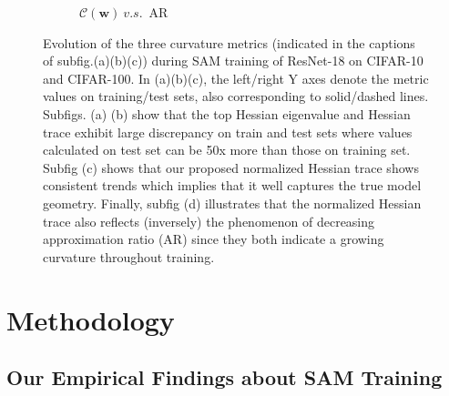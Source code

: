 \documentclass[letterpaper]{article} %
\theoremstyle{plain}
\theoremstyle{definition}
\begin{document}
\begin{figure}[ht!]
\begin{subfigure}{0.45\textwidth}
     \caption{$\mathcal{C}(\boldsymbol{w})  \: v.s. \: \operatorname{AR}$}
     \label{subfig:n_trace_vs_ar}
   \end{subfigure}
    \caption{Evolution of the three curvature metrics (indicated in the captions of subfig.(a)(b)(c)) during SAM training of ResNet-18 on CIFAR-10 and CIFAR-100. In (a)(b)(c), the left/right Y axes denote the metric values on training/test sets, also corresponding to solid/dashed lines. Subfigs. (a) (b) show that the top Hessian eigenvalue and Hessian trace exhibit large discrepancy on train and test sets where values calculated on test set can be 50x more than those on training set. Subfig (c) shows that our proposed normalized Hessian trace shows consistent trends which implies that it well captures the true model geometry. Finally, subfig (d) illustrates that the normalized Hessian trace also reflects (inversely) the phenomenon of decreasing approximation ratio (AR) since they both indicate a growing curvature throughout training.}
    \label{fig:CR}
\end{figure}


\section{Methodology}
\label{sec:Methodology}

\subsection{Our Empirical Findings about SAM Training}\label{subsec:empirical}
\end{document}
